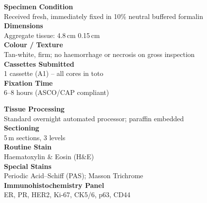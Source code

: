 \documentclass[11pt,a4paper]{article}
\newcommand{\fieldlabel}[1]{\textcolor{PathMidGray}{\footnotesize\textbf{#1}}}
\newcommand{\fieldval}[1]{\textcolor{PathBlue}{\small #1}}
\begin{document}
\begin{minipage}[t]{0.485\linewidth}
\begin{tcolorbox}[tealbox, title={\faSearch\quad Gross Examination}]
  \setlength{\parskip}{3pt}
  \fieldlabel{Specimen Condition}\\
  \fieldval{Received fresh, immediately fixed in 10\% neutral buffered formalin}\\[5pt]
  \fieldlabel{Dimensions}\\
  \fieldval{Aggregate tissue: 4.8\,cm \texttimes{} 0.15\,cm}\\[5pt]
  \fieldlabel{Colour / Texture}\\
  \fieldval{Tan-white, firm; no haemorrhage or necrosis on gross inspection}\\[5pt]
  \fieldlabel{Cassettes Submitted}\\
  \fieldval{1 cassette (A1) -- all cores in toto}\\[5pt]
  \fieldlabel{Fixation Time}\\
  \fieldval{6--8 hours (ASCO/CAP compliant)}
\end{tcolorbox}
\end{minipage}%
\hfill
\begin{minipage}[t]{0.485\linewidth}
\begin{tcolorbox}[tealbox, title={\faCog\quad Processing \& Staining}]
  \setlength{\parskip}{3pt}
  \fieldlabel{Tissue Processing}\\
  \fieldval{Standard overnight automated processor; paraffin embedded}\\[5pt]
  \fieldlabel{Sectioning}\\
  \fieldval{5\,\textmu{}m sections, 3 levels}\\[5pt]
  \fieldlabel{Routine Stain}\\
  \fieldval{Haematoxylin \& Eosin (H\&{}E)}\\[5pt]
  \fieldlabel{Special Stains}\\
  \fieldval{Periodic Acid--Schiff (PAS); Masson Trichrome}\\[5pt]
  \fieldlabel{Immunohistochemistry Panel}\\
  \fieldval{ER, PR, HER2, Ki-67, CK5/6, p63, CD44}
\end{tcolorbox}
\end{minipage}

\par\vspace{4pt}
\end{document}
